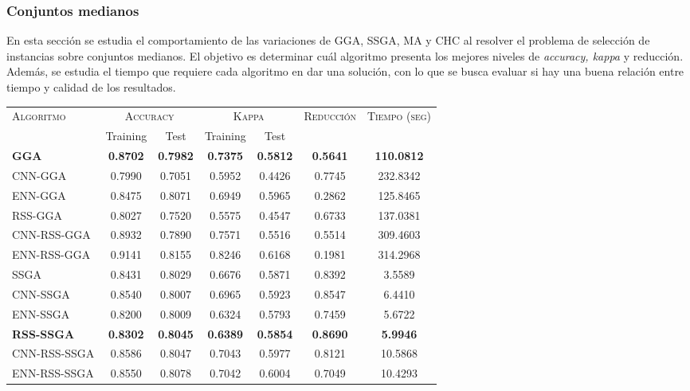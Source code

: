 \subsubsection{Conjuntos medianos}

En esta sección se estudia el comportamiento de las variaciones de GGA, SSGA, MA y CHC al resolver el problema de selección de instancias sobre conjuntos medianos. El objetivo es determinar cuál algoritmo presenta los mejores niveles de \emph{accuracy, kappa} y reducción. Además, se estudia el tiempo que requiere cada algoritmo en dar una solución, con lo que se busca evaluar si hay una buena relación entre tiempo y calidad de los resultados.


\begin{table}[h!]
\centering
\begin{tabular}{l c c c c c c}
\hline
\multirow{2}{*}{\textsc{Algoritmo}}
	& \multicolumn{2}{c}{\textsc{Accuracy}}
	& \multicolumn{2}{c}{\textsc{Kappa}}
	& \textsc{Reducción}
	& \textsc{Tiempo (seg)} \\
	& Training & Test
	& Training & Test \\ 
\hline
\hline

\textbf{GGA}         & \textbf{0.8702} & \textbf{0.7982} & \textbf{0.7375} & \textbf{0.5812} & \textbf{0.5641} & \textbf{110.0812} \\
CNN-GGA     & 0.7990 & 0.7051 & 0.5952 & 0.4426 & 0.7745 & 232.8342 \\
ENN-GGA     & 0.8475 & 0.8071 & 0.6949 & 0.5965 & 0.2862 & 125.8465 \\
RSS-GGA     & 0.8027 & 0.7520 & 0.5575 & 0.4547 & 0.6733 & 137.0381 \\
CNN-RSS-GGA & 0.8932 & 0.7890 & 0.7571 & 0.5516 & 0.5514 & 309.4603 \\
ENN-RSS-GGA & 0.9141 & 0.8155 & 0.8246 & 0.6168 & 0.1981 & 314.2968 \\

\hline

SSGA & 0.8431 & 0.8029 & 0.6676 & 0.5871 & 0.8392 & 3.5589 \\
CNN-SSGA & 0.8540 & 0.8007 & 0.6965 & 0.5923 & 0.8547 & 6.4410 \\
ENN-SSGA & 0.8200 & 0.8009 & 0.6324 & 0.5793 & 0.7459 & 5.6722 \\
\textbf{RSS-SSGA} & \textbf{0.8302} & \textbf{0.8045} & \textbf{0.6389} & \textbf{0.5854} & \textbf{0.8690} & \textbf{5.9946} \\
CNN-RSS-SSGA & 0.8586 & 0.8047 & 0.7043 & 0.5977 & 0.8121 & 10.5868 \\
ENN-RSS-SSGA & 0.8550 & 0.8078 & 0.7042 & 0.6004 & 0.7049 & 10.4293 \\


\end{tabular}
\end{table}
